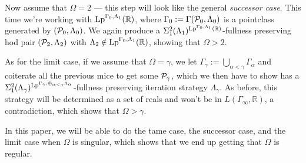 \documentclass[../../main]{subfiles}
\begin{document}
\qquad Now assume that $\Omega=2$ --- this step will look like the general \textit{successor case}. This time we're working with $\lp^{\Gamma_0,\Lambda_1}(\mathbb R)$, where $\Gamma_0:=\Gamma(\P_0,\Lambda_0)$ is a pointclass generated by $(\P_0,\Lambda_0)$. We again produce a $\Sigma^2_1(\Lambda_1)^{\lp^{\Gamma_0,\Lambda_1}(\mathbb R)}$-fullness preserving hod pair $(\P_2,\Lambda_2)$ with $\Lambda_2\notin\lp^{\Gamma_0,\Lambda_1}(\mathbb R)$, showing that $\Omega>2$.

\qquad As for the limit case, if we assume that $\Omega=\gamma$, we let $\Gamma_\gamma:=\bigcup_{\alpha<\gamma}\Gamma_\alpha$ and coiterate all the previous mice to get some $\P_\gamma$, which we then have to show has a $\Sigma^2_1(\Lambda_\gamma)^{\lp^{\Gamma_\gamma,\oplus_{\alpha<\gamma}\Lambda_\alpha}}$-fullness preserving iteration strategy $\Lambda_\gamma$. As before, this strategy will be determined as a set of reals and won't be in $L(\Gamma_\infty,\mathbb R)$, a contradiction, which shows that $\Omega>\gamma$.

\qquad In this paper, we will be able to do the tame case, the successor case, and the limit case when $\Omega$ is singular, which shows that we end up getting that $\Omega$ is regular.
\end{document}
